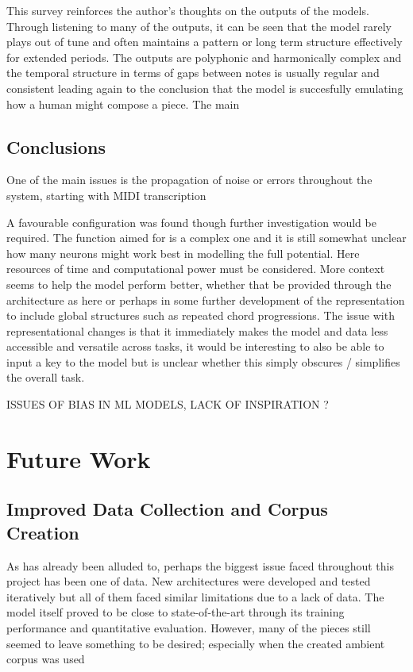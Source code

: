 \documentclass[12pt,]{article}
\begin{document}
This survey reinforces the author's thoughts on the outputs of the
models. Through listening to many of the outputs, it can be seen that
the model rarely plays out of tune and often maintains a pattern or long
term structure effectively for extended periods. The outputs are
polyphonic and harmonically complex and the temporal structure in terms
of gaps between notes is usually regular and consistent leading again to
the conclusion that the model is succesfully emulating how a human might
compose a piece. The main

\hypertarget{conclusions}{%
\subsection{Conclusions}\label{conclusions}}

One of the main issues is the propagation of noise or errors throughout
the system, starting with MIDI transcription

A favourable configuration was found though further investigation would
be required. The function aimed for is a complex one and it is still
somewhat unclear how many neurons might work best in modelling the full
potential. Here resources of time and computational power must be
considered. More context seems to help the model perform better, whether
that be provided through the architecture as here or perhaps in some
further development of the representation to include global structures
such as repeated chord progressions. The issue with representational
changes is that it immediately makes the model and data less accessible
and versatile across tasks, it would be interesting to also be able to
input a key to the model but is unclear whether this simply obscures /
simplifies the overall task.

ISSUES OF BIAS IN ML MODELS, LACK OF INSPIRATION ?

\hypertarget{future-work}{%
\section{Future Work}\label{future-work}}

\hypertarget{improved-data-collection-and-corpus-creation}{%
\subsection{Improved Data Collection and Corpus
Creation}\label{improved-data-collection-and-corpus-creation}}

As has already been alluded to, perhaps the biggest issue faced
throughout this project has been one of data. New architectures were
developed and tested iteratively but all of them faced similar
limitations due to a lack of data. The model itself proved to be close
to state-of-the-art through its training performance and quantitative
evaluation. However, many of the pieces still seemed to leave something
to be desired; especially when the created ambient corpus was used
\end{document}
